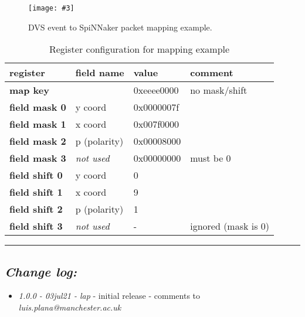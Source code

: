 \documentclass[11pt,a4paper,twoside]{article}
\newcommand{\image}[5][]
{
\begin{figure}[#2]
   \begin{center}
      \texttt{[image: \#3]}
      \caption{#5}
      \label{fig:#4}
   \end{center}
\end{figure}
}
\begin{document}
\image[width = 0.9 \textwidth]{!h}{mapper_ex}{fig:maper_fig}
{DVS event to SpiNNaker packet mapping example.}


\begin{table}[!ht]
	\begin{center}
		\begin{tabular}{| l l l l |}
			\hline
			\textbf{register}      & \textbf{field name} & \textbf{value} & \textbf{comment} \\%
			\hline
			\hline
			\textbf{map key}       &                   & 0xeeee0000 & no mask/shift  \\%
			\textbf{field mask 0}  & y coord           & 0x0000007f &                \\%
			\textbf{field mask 1}  & x coord           & 0x007f0000 &                \\%
			\textbf{field mask 2}  & p (polarity)      & 0x00008000 &                \\%
			\textbf{field mask 3}  & \textit{not used} & 0x00000000 & must be 0      \\%
			\textbf{field shift 0} & y coord           & 0          &                \\%
			\textbf{field shift 1} & x coord           & 9          &                \\%
			\textbf{field shift 2} & p (polarity)      & 1          &                \\%
			\textbf{field shift 3} & \textit{not used} & -          & ignored (mask is 0) \\%
			\hline
		\end{tabular}
		\caption{Register configuration for mapping example}
	\end{center}
	\label{tab:map_regs}
\end{table}


\vspace*{1.0cm}
\rule{\linewidth}{2pt}


\subsection*{\itshape Change log:}


\begin{itemize}
	\item {\itshape 1.0.0 - 03jul21 - lap} - initial release - comments to
	{\itshape luis.plana@manchester.ac.uk}
\end{itemize}
\end{document}
